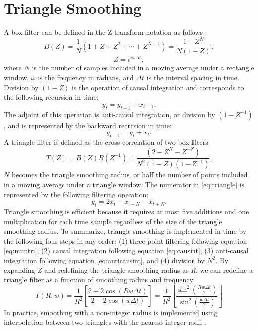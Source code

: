 \section{Triangle Smoothing}
A box filter can be defined in the Z-transform notation as follows \cite[]{claerbout1992}:
\begin{equation}
B(Z) = \frac{1}{N} (1 + Z + Z^2 +\cdots+Z^{N-1}) = \frac{1-Z^N}{N(1-Z)},
\end{equation}
\begin{equation}
Z = e^{i\omega\Delta t},
\end{equation}
where $N$ is the number of samples included in a moving average under a rectangle window, $\omega$ is the frequency in radians, and $\Delta t$ is the interval spacing in time. Division by $(1-Z)$ is the operation of causal integration and corresponds to the following recursion in time:
\begin{equation}
y_t = y_{t-1}+x_{t-1}.
\label{eq:causint}
\end{equation}
The adjoint of this operation is anti-causal integration, or division by $(1-Z^{-1})$, and is represented by the backward recursion in time:
\begin{equation}
y_{t-1} = y_{t}+x_{t}.
\label{eq:anticausint}
\end{equation}
A triangle filter is defined as the cross-correlation of two box filters \cite[]{claerbout1992}
\begin{equation}
T(Z) = B(Z)B(Z^{-1}) = \frac{(2-Z^N-Z^{-N})}{N^2(1-Z)(1-Z^{-1})}.
\label{eq:triangle}
\end{equation}
$N$ becomes the triangle smoothing radius, or half the number of points included in a moving average under a triangle window. The numerator in \ref{eq:triangle} is represented by the following filtering operation:
\begin{equation}
y_{t} = 2x_t-x_{t-N}-x_{t+N}.
\label{eq:numtri}
\end{equation}
Triangle smoothing is efficient because it requires at most five additions and one multiplication for each time sample regardless of the size of the triangle smoothing radius. 
To summarize, triangle smoothing is implemented in time by the following four steps in any order: (1) three-point filtering following equation \ref{eq:numtri}, (2) causal integration following equation \ref{eq:causint}, (3) anti-causal integration following equation \ref{eq:anticausint}, and (4) division by $N^2$. 
By expanding $Z$ and redefining the triangle smoothing radius as $R$, we can redefine a triangle filter as a function of smoothing radius and frequency
\begin{equation}
T(R,w) = \frac{1}{R^{2}}\left[\frac{2-2\cos(Rw\Delta t)}{2-2\cos(w\Delta t)}\right] = \frac{1}{R^{2}}\left[\frac{\sin^2(\frac{Rw\Delta t}{2})}{\sin^2(\frac{w\Delta t}{2})}\right]
\label{eq:triangle2}
\end{equation}
In practice, smoothing with a non-integer radius is implemented using interpolation between two triangles with the nearest integer radii \cite[]{nnint}.

